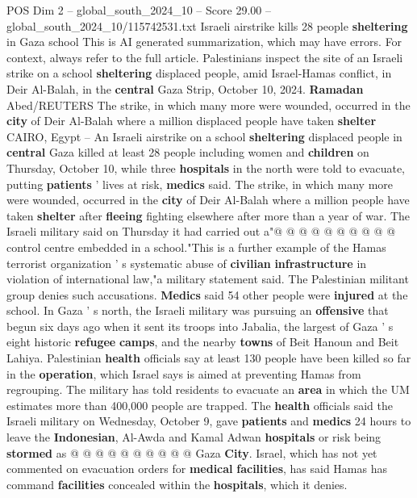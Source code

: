 \begin{textsample}{POS Dim 2 – global\_south\_2024\_10 – Score 29.00 – global\_south\_2024\_10/115742531.txt}  \label{ex:f2_pos_135}
Israeli airstrike kills 28 people \textbf{sheltering} in Gaza school This is AI generated summarization, which may have errors.
For context, always refer to the full article.
Palestinians inspect the site of an Israeli strike on a school \textbf{sheltering} displaced people, amid Israel-Hamas conflict, in Deir Al-Balah, in the \textbf{central} Gaza Strip, October 10, 2024. \textbf{Ramadan} Abed/REUTERS The strike, in which many more were wounded, occurred in the \textbf{city} of Deir Al-Balah where a million displaced people have taken \textbf{shelter} CAIRO, Egypt -- An Israeli airstrike on a school \textbf{sheltering} displaced people in \textbf{central} Gaza killed at least 28 people including women and \textbf{children} on Thursday, October 10, while three \textbf{hospitals} in the north were told to evacuate, putting \textbf{patients} ' lives at risk, \textbf{medics} said.
The strike, in which many more were wounded, occurred in the \textbf{city} of Deir Al-Balah where a million people have taken \textbf{shelter} after \textbf{fleeing} fighting elsewhere after more than a year of war.
The Israeli military said on Thursday it had carried out a"@ @ @ @ @ @ @ @ @ @ control centre embedded in a school."This is a further example of the Hamas terrorist organization ' s systematic abuse of \textbf{civilian} \textbf{infrastructure} in violation of international law,"a military statement said.
The Palestinian militant group denies such accusations. \textbf{Medics} said 54 other people were \textbf{injured} at the school.
In Gaza ' s north, the Israeli military was pursuing an \textbf{offensive} that begun six days ago when it sent its troops into Jabalia, the largest of Gaza ' s eight historic \textbf{refugee} \textbf{camps}, and the nearby \textbf{towns} of Beit Hanoun and Beit Lahiya.
Palestinian \textbf{health} officials say at least 130 people have been killed so far in the \textbf{operation}, which Israel says is aimed at preventing Hamas from regrouping.
The military has told residents to evacuate an \textbf{area} in which the UM estimates more than 400,000 people are trapped.
The \textbf{health} officials said the Israeli military on Wednesday, October 9, gave \textbf{patients} and \textbf{medics} 24 hours to leave the \textbf{Indonesian}, Al-Awda and Kamal Adwan \textbf{hospitals} or risk being \textbf{stormed} as @ @ @ @ @ @ @ @ @ @ Gaza \textbf{City}.
Israel, which has not yet commented on evacuation orders for \textbf{medical} \textbf{facilities}, has said Hamas has command \textbf{facilities} concealed within the \textbf{hospitals}, which it denies.

\end{textsample}
